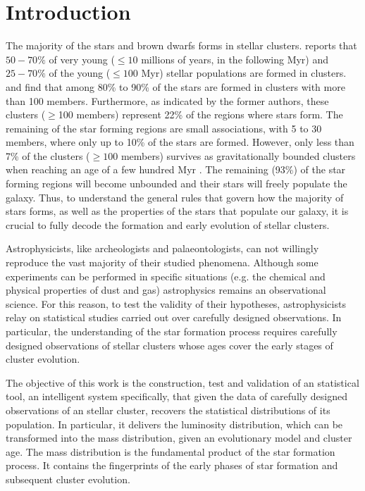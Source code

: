 \chapter{Introduction}
\label{chap:introduction}

The majority of the stars and brown dwarfs forms in stellar clusters. \citet{2000AJ....120.3139C} reports that $50-70\%$ of very young ($\leq10$ millions of years, in the following Myr) and $25-70\%$ of the young ($\leq100$ Myr) stellar populations are formed in clusters. \citet{2003AJ....126.1916P} and \citet{2003ARA&A..41...57L} find that among 80\% to 90\% of the stars are formed in clusters with more than 100 members. Furthermore, as indicated by the former authors, these clusters ($\geq$100 members) represent 22\% of the regions where stars form. The remaining of the star forming regions are small associations, with 5 to 30 members, where only up to 10\% of the stars are formed. However, only less than 7\% of the clusters ($\geq 100$ members) survives as gravitationally bounded clusters when reaching an age of a few hundred Myr \citep{2003ARA&A..41...57L}. The remaining (93\%) of the star forming regions will become unbounded and their stars will freely populate the galaxy. Thus, to understand the general rules that govern how the majority of stars forms, as well as the properties of the stars that populate our galaxy, it is crucial to fully decode the formation and early evolution of stellar clusters. 

Astrophysicists, like archeologists and palaeontologists, can not willingly reproduce the vast majority of their studied phenomena. Although some experiments can be performed in specific situations (e.g. the chemical and physical  properties of dust and gas) astrophysics remains an observational science. For this reason, to test the validity of their hypotheses, astrophysicists relay on statistical studies carried out over carefully designed observations. In particular, the understanding of the star formation process requires carefully designed observations of  stellar clusters whose ages cover the early stages of cluster evolution.

The objective of this work is the construction, test and validation of an statistical tool, an intelligent system specifically, that given the data of carefully designed observations of an stellar cluster, recovers the statistical distributions of its population. In particular, it delivers the luminosity distribution, which can be transformed into the mass distribution, given an evolutionary model and cluster age. The mass distribution is the fundamental product of the star formation process. It contains the fingerprints of the early phases of star formation and subsequent cluster evolution.

